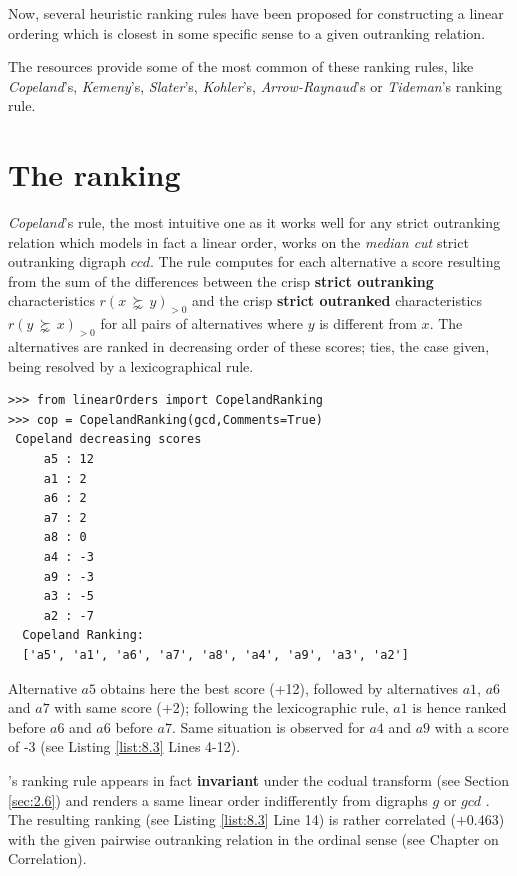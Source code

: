 Now, several heuristic ranking rules have been proposed for constructing a linear ordering which is closest in some specific sense to a given outranking relation.

The \Digraph resources provide some of the most common of these ranking rules, like \emph{Copeland}'s, \emph{Kemeny}'s, \emph{Slater}'s, \emph{Kohler}'s, \emph{Arrow-Raynaud}'s or \emph{Tideman}'s ranking rule.

\section{The \Copeland ranking}
\label{sec:8.2}

\emph{Copeland}'s rule, the most intuitive one as it works well for any strict outranking relation which models in fact a linear order, works on the \emph{median cut} strict outranking digraph $ccd$. The rule computes for each alternative a score resulting from the sum of the differences between the crisp \textbf{strict outranking} characteristics $r(x\, \succnsim \,y)_{>0}$ and the crisp \textbf{strict outranked} characteristics $r(y\, \succnsim \, x)_{>0}$  for all pairs of alternatives where $y$ is different from $x$. The alternatives are ranked in decreasing order of these \Copeland scores; ties, the case given, being resolved by a lexicographical rule. 

\begin{lstlisting}[caption={Computing a \Copeland Ranking},label=list:8.3]
>>> from linearOrders import CopelandRanking
>>> cop = CopelandRanking(gcd,Comments=True)
 Copeland decreasing scores
     a5 : 12
     a1 : 2
     a6 : 2
     a7 : 2
     a8 : 0
     a4 : -3
     a9 : -3
     a3 : -5
     a2 : -7
  Copeland Ranking:
  ['a5', 'a1', 'a6', 'a7', 'a8', 'a4', 'a9', 'a3', 'a2']
\end{lstlisting}

Alternative $a5$ obtains here the best \Copeland score (+12), followed by alternatives $a1$, $a6$ and $a7$ with same score (+2); following the lexicographic rule, $a1$ is hence ranked before $a6$ and $a6$ before $a7$. Same situation is observed for $a4$ and $a9$ with a score of -3 (see Listing \ref{list:8.3} Lines 4-12).

\Copeland 's ranking rule appears in fact \textbf{invariant} under the codual transform (see Section \ref{sec:2.6}) and renders a same linear order indifferently from digraphs $g$ or $gcd$ . The resulting ranking (see Listing \ref{list:8.3} Line 14) is rather correlated ($+0.463$) with the given pairwise outranking relation in the ordinal \Kendall sense (see Chapter on Correlation).

